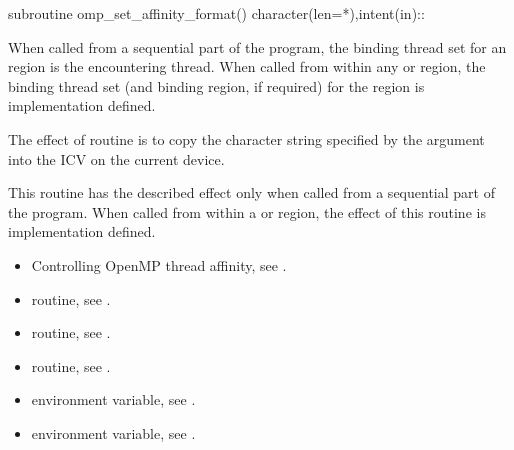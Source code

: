 \begin{fortranspecific}
\begin{ompfSubroutine}
subroutine omp_set_affinity_format()
character(len=*),intent(in)::
\end{ompfSubroutine}
\end{fortranspecific}

\binding
When called from a sequential part of the program, the binding thread 
set for an  region is the encountering 
thread. When called from within any  or  region, 
the binding thread set (and binding region, if required) for the 
 region is implementation defined.

\effect
The effect of  routine is to copy the
character string specified by the  argument into the
 ICV on the current device.

This routine has the described effect only when called from a sequential 
part of the program. When called from within a  or 
region, the effect of this routine is implementation defined.

\crossreferences
\begin{itemize}
\item Controlling OpenMP thread affinity, see
.

\item {} routine, 
see .

\item {} routine, see .

\item {} routine, see .

\item {} environment variable, see
.

\item {} environment variable, see
.
\end{itemize}

\subsection{}
\label{subsec:omp_get_affinity_format}

